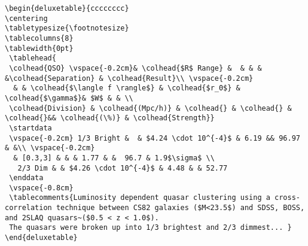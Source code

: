 \begin{verbatim}
\begin{deluxetable}{cccccccc}
\centering
\tabletypesize{\footnotesize}
\tablecolumns{8} 
\tablewidth{0pt}
 \tablehead{
 \colhead{QSO} \vspace{-0.2cm}& \colhead{$R$ Range} &  & & &  &\colhead{Separation} & \colhead{Result}\\ \vspace{-0.2cm}
  & & \colhead{$\langle f \rangle$} & \colhead{$r_0$} &  \colhead{$\gamma$}& $W$ & & \\
 \colhead{Division} & \colhead{(Mpc/h)} & \colhead{} & \colhead{} & \colhead{}&& \colhead{(\%)} & \colhead{Strength}}
 \startdata 
 \vspace{-0.2cm} 1/3 Bright &  & $4.24 \cdot 10^{-4}$ & 6.19 && 96.97 & &\\ \vspace{-0.2cm}
  & [0.3,3] & & & 1.77 & &  96.7 & 1.9$\sigma$ \\ 
   2/3 Dim & & $4.26 \cdot 10^{-4}$ & 4.48 & & 52.77
 \enddata
 \vspace{-0.8cm}
 \tablecomments{Luminosity dependent quasar clustering using a cross-correlation technique between CS82 galaxies ($M<23.5$) and SDSS, BOSS, and 2SLAQ quasars~($0.5 < z < 1.0$). 
 The quasars were broken up into 1/3 brightest and 2/3 dimmest... }
\end{deluxetable}
\end{verbatim}
